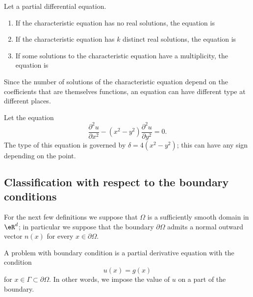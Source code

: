 \begin{definition}
    Let a partial differential equation.
    \begin{enumerate}
        \item
            If the characteristic equation has no real solutions, the equation is 
        \item
            If the characteristic equation has \( k\) distinct real solutions, the equation is 
        \item
            If some solutions to the characteristic equation have a multiplicity, the equation is 
    \end{enumerate}
\end{definition}

Since the number of solutions of the characteristic equation depend on the coefficients that are themselves functions, an equation can have different type at different places.

\begin{example}
    Let the equation
    \begin{equation}
        \frac{ \partial^2u }{ \partial x^2 }-(x^2-y^2)\frac{ \partial^2u }{ \partial y^2 }=0.
    \end{equation}
    The type of this equation is governed by \( \delta=4(x^2-y^2)\); this can have any sign depending on the point.
\end{example}

\subsection{Classification with respect to the boundary conditions}

For the next few definitions we suppose that \( \Omega\) is a sufficiently smooth domain in \( \eR^d\); in particular we suppose that the boundary \( \partial\Omega\) admits a normal outward vector \( n(x)\) for every \( x\in \partial\Omega\).

\begin{definition}
    A problem with  boundary condition is a partial derivative equation with the condition
    \begin{equation}
        u(x)=g(x)
    \end{equation}
    for \( x\in\Gamma\subset\partial\Omega\). In other words, we impose the value of \( u\) on a part of the boundary.
\end{definition}

